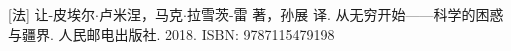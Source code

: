 \documentclass{article}
\begin{document}

\ifx\wholebook\relax \else
\begin{thebibliography}{99}

[法] 让-皮埃尔$\cdot$卢米涅，马克$\cdot$拉雪茨-雷 著，孙展 译. 从无穷开始——科学的困惑与疆界. 人民邮电出版社. 2018. ISBN: 9787115479198

\end{thebibliography}

\expandafter\enddocument

\fi
\end{document}
